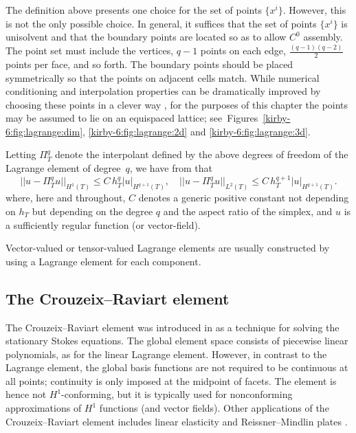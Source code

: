 The definition above presents one choice for the set of points
$\{x^i\}$. However, this is not the only possible choice. In general,
it suffices that the set of points $\{x^i\}$ is unisolvent and that
the boundary points are located so as to allow $C^0$ assembly. The
point set must include the vertices, $q-1$ points on each edge,
$\frac{(q-1)(q-2)}{2}$ points per face, and so forth. The boundary
points should be placed symmetrically so that the points on adjacent
cells match. While numerical conditioning and interpolation properties
can be dramatically improved by choosing these points in a clever way
\citep{Warburton2005}, for the purposes of this chapter the points
may be assumed to lie on an equispaced lattice;
see~Figures~\ref{kirby-6:fig:lagrange:dim},
\ref{kirby-6:fig:lagrange:2d} and \ref{kirby-6:fig:lagrange:3d}.

Letting $\Pi_T^q$ denote the interpolant defined by the above degrees
of freedom of the Lagrange element of degree~$q$, we have
from \citet{BrennerScott2008} that
\begin{equation}
  ||u - \Pi_T^q u||_{H^1(T)} \leqslant C \, h_T^{q} |u|_{H^{q+1}(T)}, \quad
  ||u - \Pi_T^q u||_{L^2(T)} \leqslant C \, h_T^{q+1} |u|_{H^{q+1}(T)}.
\end{equation}
where, here and throughout, $C$ denotes a generic positive constant
not depending on $h_T$ but depending on the degree $q$ and the aspect
ratio of the simplex, and $u$ is a sufficiently regular function (or
vector-field).

Vector-valued or tensor-valued Lagrange elements are usually constructed
by using a Lagrange element for each component.

\subsection{The Crouzeix--Raviart element}

The Crouzeix--Raviart element was introduced in
\citet{CrouzeixRaviart1973} as a technique for solving the stationary
Stokes equations. The global element space consists of piecewise linear
polynomials, as for the linear Lagrange element. However, in contrast to
the Lagrange element, the global basis functions are not required to be
continuous at all points; continuity is only imposed at the midpoint of
facets. The element is hence not $H^1$-conforming, but it is typically
used for nonconforming approximations of $H^1$ functions (and vector
fields). Other applications of the Crouzeix--Raviart element includes
linear elasticity \citep{HansboLarson2003} and Reissner--Mindlin plates
\citep{ArnoldFalk1989}.

